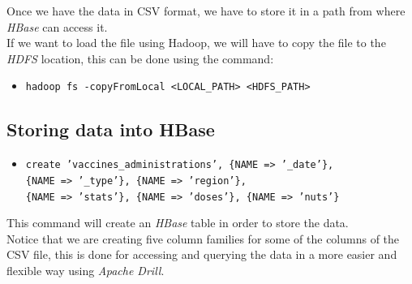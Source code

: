 \documentclass[12pt, a4paper]{article}
\begin{document}
\noindent
Once we have the data in CSV format, we have to store it in a path from where 
\emph{HBase} can access it. \\
If we want to load the file using Hadoop, we will have to copy the file to the 
\emph{HDFS} location, this can be done using the command:
\begin{footnotesize}
  \begin{itemize}
    \item[] \texttt{hadoop fs -copyFromLocal <LOCAL\_PATH>  <HDFS\_PATH>} 
  \end{itemize}
\end{footnotesize}

\subsection{Storing data into HBase}

\begin{footnotesize}
  \begin{itemize}
    \item[] \texttt{create 'vaccines\_administrations', \{NAME => '\_date'\}, \\
      \{NAME => '\_type'\}, \{NAME => 'region'\}, \\
      \{NAME => 'stats'\}, \{NAME => 'doses'\}, \{NAME => 'nuts'\}} 
  \end{itemize}
\end{footnotesize}
This command will create an \emph{HBase} table in order to store the data. \\
Notice that we are creating five column families for some of the columns of the CSV file,
this is done for accessing and querying the data in a more easier and flexible way using
\emph{Apache Drill}. 

\vfill %
\end{document}
